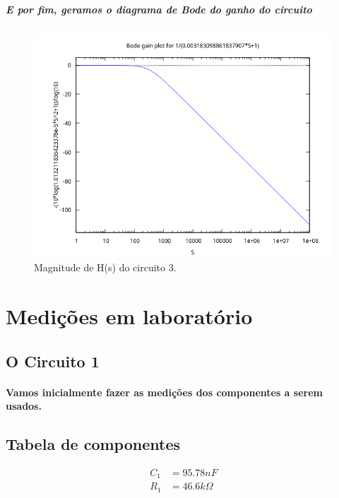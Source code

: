 \documentclass[12pt,twoside, a4paper, twocolumn]{article}
\begin{document}
\subparagraph*{E por fim, geramos o diagrama de Bode do ganho do circuito}


\begin{figure}[h]
    \centering
    \includegraphics[width=1\columnwidth]{images/bodegain1.png}
    \caption{Magnitude de H(s) do circuito 3.}
\end{figure}


\newpage




\section{Medições em laboratório}


\subsection{O Circuito 1}


\paragraph{Vamos inicialmente fazer as medições dos componentes a serem usados.}


\subsection{Tabela de componentes}


\begin{equation*}
    \begin{aligned}
        C_1 & = 95.78nF         \\
        R_1 & = 46.6k \varOmega \\
    \end{aligned}
\end{equation*}
\end{document}
